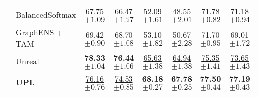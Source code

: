 \begin{table*}[ht!]
\begin{center}
\begin{scriptsize}
{\begin{tabular}{@{}rlcc|cc|cc@{}}
                     
                     & BalancedSoftmax \cite{ren2020balanced}
                     & 67.75 \tiny{$\pm 1.09$} & 66.47 \tiny{$\pm 1.27$}
                     & 52.09 \tiny{$\pm 1.61$} & 48.55 \tiny{$\pm 2.01$}
                     & 71.78 \tiny{$\pm 0.82$} & 71.18 \tiny{$\pm 0.94$} \\

                     & GraphENS \cite{park2022graphens}+ TAM \cite{song2022tam}
                     & 69.42 \tiny{$\pm 0.90$} & 68.70 \tiny{$\pm 1.08$}
                     & 53.10 \tiny{$\pm 1.82$} & 50.67 \tiny{$\pm 2.28$}
                     & 71.70 \tiny{$\pm 0.95$} & 69.01 \tiny{$\pm 1.72$} \\

                     & Unreal \cite{yan2023unreal}
                     & \textbf{78.33} \tiny{$\pm 1.04$} & \textbf{76.44} \tiny{$\pm 1.06$}
                     & \underline{65.63} \tiny{$\pm 1.38$} & \underline{64.94} \tiny{$\pm 1.38$}
                     & \underline{75.35} \tiny{$\pm 1.41$} & \underline{73.65} \tiny{$\pm 1.43$} \\
                     
                     \cline{1-8}
                                   
                     
                     & \textbf{UPL}
                     & \underline{76.16} \tiny{$\pm 0.76$} & \underline{74.53} \tiny{$\pm 0.85$}
                    & \textbf{68.18} \tiny{$\pm 0.27$} & \textbf{67.78} \tiny{$\pm 0.25$}
                    & \textbf{77.50} \tiny{$\pm 0.44$} & \textbf{77.19} \tiny{$\pm 0.43$} \\

                     
\bottomrule
\end{tabular}}

\end{scriptsize}
\end{center}
\label{tb:main_chart_homo}
\vspace{-0.05in}
\end{table*}
